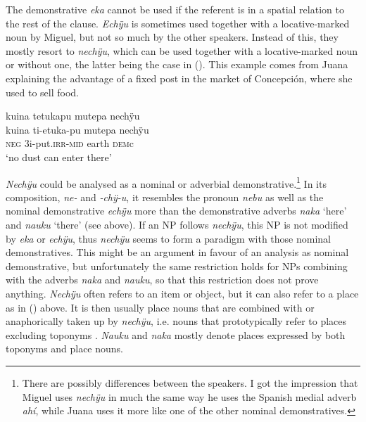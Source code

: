The demonstrative \textit{eka} cannot be used if the referent is in a spatial relation to the rest of the clause. \textit{Echÿu} is sometimes used together with a locative-marked noun by Miguel, but not so much by the other speakers. Instead of this, they mostly resort to \textit{nechÿu}, which can be used together with a locative-marked noun or without one, the latter being the case in (). This example comes from Juana explaining the advantage of a fixed post in the market of Concepción, where she used to sell food.

\ea\label{ex:newex-DEMc}
\begingl
\glpreamble kuina tetukapu mutepa nechÿu\\
\gla kuina ti-etuka-pu mutepa nechÿu\\
\glb \textsc{neg} 3i-put.\textsc{irr}-\textsc{mid} earth \textsc{dem}c\\
\glft ‘no dust can enter there’
\endgl
\trailingcitation{[jxx-e110923l-2.164]}
\xe


\textit{Nechÿu} could be analysed as a nominal or adverbial demonstrative.\footnote{There are possibly differences between the speakers. I got the impression that Miguel uses \textit{nechÿu} in much the same way he uses the Spanish medial adverb \textit{ahí}, while Juana uses it more like one of the other nominal demonstratives.}  In its composition, \textit{ne-} and \textit{-chÿ-u}, it resembles the pronoun \textit{nebu} as well as the nominal demonstrative \textit{echÿu} more than the demonstrative adverbs \textit{naka} ‘here’ and \textit{nauku} ‘there’ (see  above). If an NP follows \textit{nechÿu}, this NP is not modified by \textit{eka} or \textit{echÿu}, thus \textit{nechÿu} seems to form a paradigm with those nominal demonstratives. This might be an argument in favour of an analysis as nominal demonstrative, but unfortunately the same restriction holds for NPs combining with the adverbs \textit{naka} and \textit{nauku}, so that this restriction does not prove anything. \textit{Nechÿu} often refers to an item or object, but it can also refer to a place as in () above. It is then usually place nouns that are combined with or anaphorically taken up by \textit{nechÿu}, i.e. nouns that prototypically refer to places excluding toponyms \citep[cf.][42]{StolzAL2014}. \textit{Nauku} and \textit{naka} mostly denote places expressed by both toponyms and place nouns.

